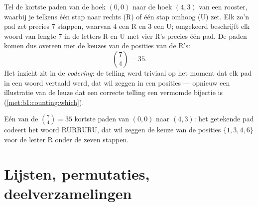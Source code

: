 \begin{example}[Roosterpaden]\label{ex:b1:counting:paths}
Tel de kortste paden van de hoek $(0,0)$ naar de hoek $(4, 3)$ van
een rooster, waarbij je telkens één stap naar rechts (R) of één
stap omhoog (U) zet. Elk zo'n pad zet precies $7$ stappen, waarvan
$4$ een R en $3$ een U; omgekeerd beschrijft elk woord van lengte
$7$ in de letters R en U met vier R's precies één pad. De paden
komen dus  overeen met de keuzes van de posities van de
R's:
\[
\binom{7}{4} = 35 .
\]
Het inzicht zit in de \emph{codering}: de telling werd triviaal op
het moment dat elk pad in een woord vertaald werd, dat wil zeggen
in een  posities --- opnieuw een illustratie van de
leuze dat een correcte telling een vermomde bijectie is
(\cref{met:b1:counting:which}).
\end{example}

\begin{omfigure}

{\small Eén van de $\binom74 = 35$ kortste paden van $(0,0)$ naar
$(4,3)$: het getekende pad codeert het woord RURRURU, dat wil zeggen
de keuze van de posities $\{1,3,4,6\}$ voor de letter R onder de
zeven stappen.}
\end{omfigure}

\section{Lijsten, permutaties, deelverzamelingen}

